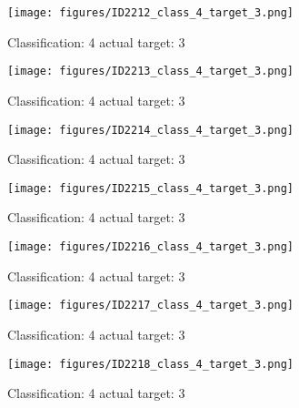 \begin{figure}[h!]
\begin{center}
\texttt{[image: figures/ID2212\_class\_4\_target\_3.png]}
\end{center}
\caption{ Classification: 4 actual target: 3}
\label{fig:ID2212_class_4_target_3}
\end{figure}
\begin{figure}[h!]
\begin{center}
\texttt{[image: figures/ID2213\_class\_4\_target\_3.png]}
\end{center}
\caption{ Classification: 4 actual target: 3}
\label{fig:ID2213_class_4_target_3}
\end{figure}
\begin{figure}[h!]
\begin{center}
\texttt{[image: figures/ID2214\_class\_4\_target\_3.png]}
\end{center}
\caption{ Classification: 4 actual target: 3}
\label{fig:ID2214_class_4_target_3}
\end{figure}
\begin{figure}[h!]
\begin{center}
\texttt{[image: figures/ID2215\_class\_4\_target\_3.png]}
\end{center}
\caption{ Classification: 4 actual target: 3}
\label{fig:ID2215_class_4_target_3}
\end{figure}
\begin{figure}[h!]
\begin{center}
\texttt{[image: figures/ID2216\_class\_4\_target\_3.png]}
\end{center}
\caption{ Classification: 4 actual target: 3}
\label{fig:ID2216_class_4_target_3}
\end{figure}
\begin{figure}[h!]
\begin{center}
\texttt{[image: figures/ID2217\_class\_4\_target\_3.png]}
\end{center}
\caption{ Classification: 4 actual target: 3}
\label{fig:ID2217_class_4_target_3}
\end{figure}
\begin{figure}[h!]
\begin{center}
\texttt{[image: figures/ID2218\_class\_4\_target\_3.png]}
\end{center}
\caption{ Classification: 4 actual target: 3}
\label{fig:ID2218_class_4_target_3}
\end{figure}
